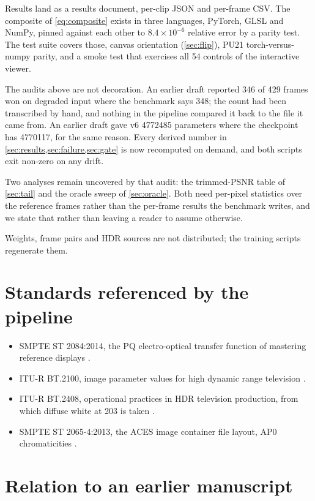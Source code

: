 Results land as a results document, per-clip JSON and per-frame CSV. The
composite of \cref{eq:composite} exists in three languages, PyTorch, GLSL and
NumPy, pinned against each other to $8.4 \times 10^{-6}$ relative error by a
parity test. The test suite covers those, canvas orientation
(\cref{sec:flip}), PU21 torch-versus-numpy parity, and a smoke test that
exercises all 54 controls of the interactive viewer.

The audits above are not decoration. An earlier draft reported 346 of 429 frames
won on degraded input where the benchmark says 348; the count had been
transcribed by hand, and nothing in the pipeline compared it back to the file it
came from. An earlier draft gave v6 \num{4772485} parameters where the
checkpoint has \num{4770117}, for the same reason. Every derived number in
\cref{sec:results,sec:failure,sec:gate} is now recomputed on demand, and both
scripts exit non-zero on any drift.

Two analyses remain uncovered by that audit: the trimmed-PSNR table of
\cref{sec:tail} and the oracle sweep of \cref{sec:oracle}. Both need per-pixel
statistics over the reference frames rather than the per-frame results the
benchmark writes, and we state that rather than leaving a reader to assume
otherwise.

Weights, frame pairs and HDR sources are not distributed; the training scripts
regenerate them.

\section{Standards referenced by the pipeline}
\label{sec:standards}

\begin{itemize}
\item SMPTE ST 2084:2014, the PQ electro-optical transfer function of mastering
  reference displays \citep{st2084}.
\item ITU-R BT.2100, image parameter values for high dynamic range television
  \citep{bt2100}.
\item ITU-R BT.2408, operational practices in HDR television production, from
  which diffuse white at \SI{203}{\nits} is taken \citep{bt2408}.
\item SMPTE ST 2065-4:2013, the ACES image container file layout, AP0
  chromaticities \citep{st20654}.
\end{itemize}

\section{Relation to an earlier manuscript}
\label{sec:withdrawal}

